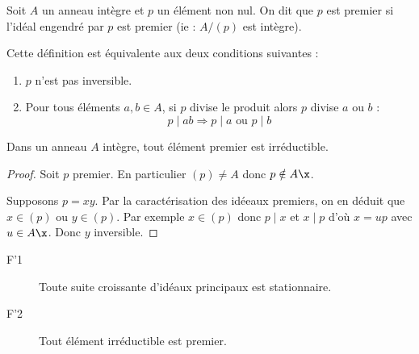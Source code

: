 \begin{defiprop}
 
Soit $A$ un anneau intègre et $p$ un élément non nul. On dit que $p$ est
premier si l'idéal engendré par $p$ est premier (ie : $A/(p)$ est intègre).

Cette définition est équivalente aux deux conditions suivantes :
\begin{enumerate}
 \item $p$ n'est pas inversible.
 \item Pour tous éléments $a,b \in A$, si $p$ divise le produit alors $p$
divise $a$ ou $b$ :
\begin{displaymath}
 p\mid ab \Longrightarrow p\mid a \text{ ou } p\mid b
\end{displaymath}
\end{enumerate}
\end{defiprop}

\begin{prop}
 
Dans un anneau $A$ intègre, tout élément premier est irréductible.
\end{prop}

\begin{proof}
Soit $p$ premier. En particulier $(p)\neq A$ donc $p\notin A\x$.

Supposons $p=xy$. Par la caractérisation des idéeaux premiers, on en déduit que
$x\in (p)$ ou $y\in (p)$. Par exemple $x\in(p)$ donc $p\mid x$ et $x\mid
p$ d'où $x = up$ avec $u \in A\x$. Donc $y$ inversible.
\end{proof}

\begin{prop}
\begin{description}
 \item [F'1] Toute suite croissante d'idéaux principaux est stationnaire.
 \item [F'2] Tout élément irréductible est premier.
\end{description}
\end{prop}


